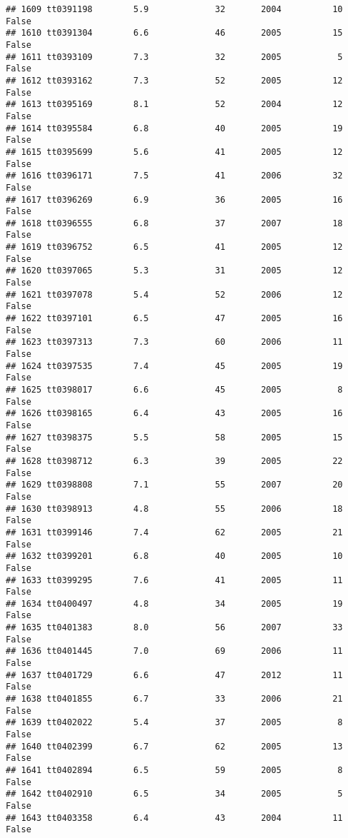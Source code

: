 \documentclass[
]{article}
\begin{document}
\begin{verbatim}
## 1609 tt0391198        5.9             32       2004          10   False
## 1610 tt0391304        6.6             46       2005          15   False
## 1611 tt0393109        7.3             32       2005           5   False
## 1612 tt0393162        7.3             52       2005          12   False
## 1613 tt0395169        8.1             52       2004          12   False
## 1614 tt0395584        6.8             40       2005          19   False
## 1615 tt0395699        5.6             41       2005          12   False
## 1616 tt0396171        7.5             41       2006          32   False
## 1617 tt0396269        6.9             36       2005          16   False
## 1618 tt0396555        6.8             37       2007          18   False
## 1619 tt0396752        6.5             41       2005          12   False
## 1620 tt0397065        5.3             31       2005          12   False
## 1621 tt0397078        5.4             52       2006          12   False
## 1622 tt0397101        6.5             47       2005          16   False
## 1623 tt0397313        7.3             60       2006          11   False
## 1624 tt0397535        7.4             45       2005          19   False
## 1625 tt0398017        6.6             45       2005           8   False
## 1626 tt0398165        6.4             43       2005          16   False
## 1627 tt0398375        5.5             58       2005          15   False
## 1628 tt0398712        6.3             39       2005          22   False
## 1629 tt0398808        7.1             55       2007          20   False
## 1630 tt0398913        4.8             55       2006          18   False
## 1631 tt0399146        7.4             62       2005          21   False
## 1632 tt0399201        6.8             40       2005          10   False
## 1633 tt0399295        7.6             41       2005          11   False
## 1634 tt0400497        4.8             34       2005          19   False
## 1635 tt0401383        8.0             56       2007          33   False
## 1636 tt0401445        7.0             69       2006          11   False
## 1637 tt0401729        6.6             47       2012          11   False
## 1638 tt0401855        6.7             33       2006          21   False
## 1639 tt0402022        5.4             37       2005           8   False
## 1640 tt0402399        6.7             62       2005          13   False
## 1641 tt0402894        6.5             59       2005           8   False
## 1642 tt0402910        6.5             34       2005           5   False
## 1643 tt0403358        6.4             43       2004          11   False

\end{verbatim}
\end{document}
